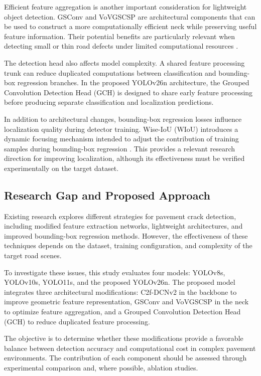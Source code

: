 \documentclass[conference]{IEEEtran}
\begin{document}
Efficient feature aggregation is another important consideration
for lightweight object detection. GSConv and VoVGSCSP are architectural
components that can be used to construct a more computationally
efficient neck while preserving useful feature information. Their
potential benefits are particularly relevant when detecting small
or thin road defects under limited computational resources
\cite{P26_YOLO_DGVG}.

The detection head also affects model complexity. A shared feature
processing trunk can reduce duplicated computations between
classification and bounding-box regression branches. In the proposed
YOLOv26n architecture, the Grouped Convolution Detection Head (GCH)
is designed to share early feature processing before producing
separate classification and localization predictions.

In addition to architectural changes, bounding-box regression losses
influence localization quality during detector training. Wise-IoU
(WIoU) introduces a dynamic focusing mechanism intended to adjust
the contribution of training samples during bounding-box regression
\cite{P21_WiseIoU}. This provides a relevant research direction for
improving localization, although its effectiveness must be verified
experimentally on the target dataset.

\subsection{Research Gap and Proposed Approach}

Existing research explores different strategies for pavement crack
detection, including modified feature extraction networks, lightweight
architectures, and improved bounding-box regression methods. However,
the effectiveness of these techniques depends on the dataset,
training configuration, and complexity of the target road scenes.

To investigate these issues, this study evaluates four models:
YOLOv8s, YOLOv10s, YOLO11s, and the proposed YOLOv26n. The proposed
model integrates three architectural modifications: C2f-DCNv2 in
the backbone to improve geometric feature representation, GSConv
and VoVGSCSP in the neck to optimize feature aggregation, and a
Grouped Convolution Detection Head (GCH) to reduce duplicated
feature processing.

The objective is to determine whether these modifications provide
a favorable balance between detection accuracy and computational
cost in complex pavement environments. The contribution of each
component should be assessed through experimental comparison and,
where possible, ablation studies.
\end{document}
